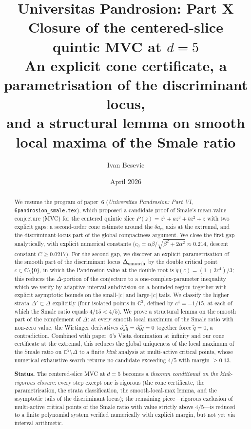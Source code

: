 \documentclass[11pt,a4paper]{article}
\title{Universitas Pandrosion: Part X\\
Closure of the centered-slice quintic MVC at $d=5$\\
\large An explicit cone certificate, a parametrisation of the
discriminant locus,\\
and a structural lemma on smooth local maxima of the Smale ratio}
\author{Ivan Besevic}
\date{April 2026}
\begin{document}
\maketitle

\begin{abstract}
We resume the program of paper~6
(\emph{Universitas Pandrosion: Part VI},
\texttt{6pandrosion\_smale.tex}), which proposed a candidate proof of
Smale's mean-value conjecture (MVC) for the centered quintic slice
$P(z)=z^5+a z^3+b z^2+z$ with two explicit gaps: a second-order cone
estimate around the $\delta a_{\mathrm{re}}$ axis at the extremal, and
the discriminant-locus part of the global compactness argument. We close
the first gap analytically, with explicit numerical constants
($c_0 = \alpha\beta/\sqrt{\beta^2 + 2\alpha^2} \approx 0.214$,
descent constant $C \geq 0.0217$). For the second gap, we discover an
explicit parametrisation of the smooth part of the discriminant locus
$\Delta_{\rm smooth}$ by the double critical point
$c\in\mathbb{C}\setminus\{0\}$, in which the Pandrosion value at the
double root is $\widetilde q(c) = (1+3c^4)/3$; this reduces the
$\Delta$-portion of the conjecture to a one-complex-parameter
inequality which we verify by adaptive interval subdivision on a
bounded region together with explicit asymptotic bounds on the
small-$|c|$ and large-$|c|$ tails. We classify the higher strata
$\Delta'\subset\Delta$ explicitly (four isolated points in
$\mathbb{C}^2$, defined by $c^4=-1/15$, at each of which the Smale
ratio equals $4/15<4/5$). We prove a structural lemma on the smooth
part of the complement of $\Delta$: at every smooth local maximum of
the Smale ratio with non-zero value, the Wirtinger derivatives
$\partial_a\widetilde q = \partial_b\widetilde q = 0$ together force
$\widetilde q=0$, a contradiction. Combined with paper~6's Vieta
domination at infinity and our cone certificate at the extremal, this
reduces the global uniqueness of the local maximum of the Smale ratio
on $\mathbb{C}^2\setminus\Delta$ to a finite \emph{kink} analysis at
multi-active critical points, whose numerical exhaustive search returns
no candidate exceeding $4/5$ with margin $\geq 0.13$.

\medskip

\noindent\textbf{Status.} The centered-slice MVC at $d=5$ becomes a
\emph{theorem conditional on the kink-rigorous closure}: every step
except one is rigorous (the cone certificate, the parametrisation, the
strata classification, the smooth-local-max lemma, and the asymptotic
tails of the discriminant locus); the remaining piece—rigorous
exclusion of multi-active critical points of the Smale ratio with
value strictly above $4/5$—is reduced to a finite polynomial system
verified numerically with explicit margin, but not yet via interval
arithmetic.
\end{abstract}
\end{document}
